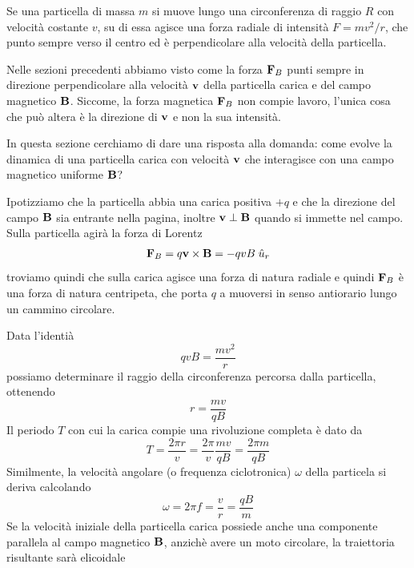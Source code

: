 Se una particella di massa $m$ si muove lungo una circonferenza di raggio $R$ con velocit\`a costante $v$, su di essa agisce una forza radiale di intensit\`a $F = mv^2/r$, che punto sempre verso il centro ed \`e perpendicolare alla velocit\`a della particella.
\newline

\noindent Nelle sezioni precedenti abbiamo visto come la forza $\bold{F}_{B}$ punti sempre in direzione perpendicolare alla velocit\`a $\bold{v}$ della particella carica e del campo magnetico $\bold{B}$. Siccome, la forza magnetica $\bold{F}_B$ non compie lavoro, l'unica cosa che pu\`o altera \`e la direzione di $\bold{v}$ e non la sua intensit\`a.

In questa sezione cerchiamo di dare una risposta alla domanda: come evolve la dinamica di una particella carica con velocit\`a $\bold{v}$ che interagisce con una campo magnetico uniforme $\bold{B}$?

Ipotizziamo che la particella abbia una carica positiva $+q$ e che la direzione del campo $\bold{B}$ sia entrante nella pagina, inoltre $\bold{v} \perp \bold{B}$ quando si immette nel campo. Sulla particella agir\`a la forza di Lorentz 
\begin{equation}
	\bold{F}_{B} = q\bold{v} \times \bold{B} = -qvB \;\hat{u}_{r}
\end{equation}
troviamo quindi che sulla carica agisce una forza di natura radiale e quindi $\bold{F}_{B}$ \`e una forza di natura centripeta, che porta $q$ a muoversi in senso antiorario lungo un cammino circolare.


Data l'identi\`a 
\begin{equation*}
	qvB = \frac{mv^2}{r}
\end{equation*}
possiamo determinare il raggio della circonferenza percorsa dalla particella, ottenendo
\begin{equation*}
	r = \frac{mv}{qB}
\end{equation*}
Il periodo $T$ con cui la carica compie una rivoluzione completa \`e dato da 
\begin{equation*}
	T = \frac{2 \pi r}{v} = \frac{2\pi}{v} \frac{mv}{qB} = \frac{2\pi m}{qB}
\end{equation*}
Similmente, la velocit\`a angolare (o frequenza ciclotronica) $\omega$ della particela si deriva calcolando
\begin{equation*}
	\omega = 2 \pi f = \frac{v}{r} = \frac{qB}{m}
\end{equation*}
Se la velocit\`a iniziale della particella carica possiede anche una componente parallela al campo magnetico $\bold{B}$, anzich\`e avere un moto circolare, la traiettoria risultante sar\`a elicoidale 

